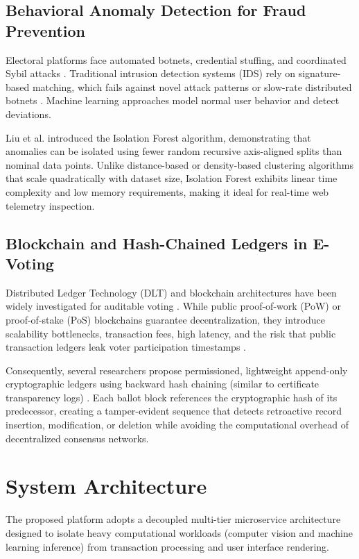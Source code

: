\documentclass[conference]{IEEEtran}
\begin{document}
\subsection{Behavioral Anomaly Detection for Fraud Prevention}
Electoral platforms face automated botnets, credential stuffing, and coordinated Sybil attacks \cite{douceur2002sybil}. Traditional intrusion detection systems (IDS) rely on signature-based matching, which fails against novel attack patterns or slow-rate distributed botnets \cite{debar1999towards}. Machine learning approaches model normal user behavior and detect deviations. 

Liu et al. \cite{liu2008isolation, liu2012isolation} introduced the Isolation Forest algorithm, demonstrating that anomalies can be isolated using fewer random recursive axis-aligned splits than nominal data points. Unlike distance-based or density-based clustering algorithms that scale quadratically with dataset size, Isolation Forest exhibits linear time complexity and low memory requirements, making it ideal for real-time web telemetry inspection.

\subsection{Blockchain and Hash-Chained Ledgers in E-Voting}
Distributed Ledger Technology (DLT) and blockchain architectures have been widely investigated for auditable voting \cite{kshetri2018blockchain, crosby2016blockchain}. While public proof-of-work (PoW) or proof-of-stake (PoS) blockchains guarantee decentralization, they introduce scalability bottlenecks, transaction fees, high latency, and the risk that public transaction ledgers leak voter participation timestamps \cite{park2021going}. 

Consequently, several researchers propose permissioned, lightweight append-only cryptographic ledgers using backward hash chaining (similar to certificate transparency logs) \cite{laurie2014certificate}. Each ballot block references the cryptographic hash of its predecessor, creating a tamper-evident sequence that detects retroactive record insertion, modification, or deletion while avoiding the computational overhead of decentralized consensus networks.

\section{System Architecture}
The proposed platform adopts a decoupled multi-tier microservice architecture designed to isolate heavy computational workloads (computer vision and machine learning inference) from transaction processing and user interface rendering.
\end{document}
